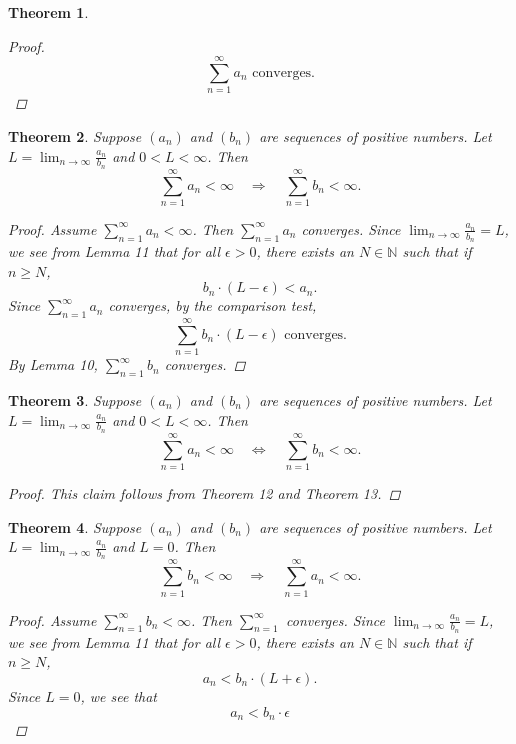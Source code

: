 \documentclass{amsart}
\newtheorem{theorem}{Theorem}
\begin{document}
\begin{enumerate}[1.]
\begin{theorem}
\begin{proof}
\[            \displaystyle \sum_{n=1}^{\infty} a_n \text{ converges.}
        \]
    \end{proof}
\end{theorem}
\begin{theorem}
    Suppose $(a_n)$ and $(b_n)$ are sequences of positive numbers. Let $\displaystyle L= \lim_{n\to\infty}\frac{a_n}{b_n}$ and $0 < L < \infty$.
    Then 
    \[ \sum_{n=1}^{\infty} a_n < \infty \quad \Rightarrow \quad \sum_{n=1}^{\infty} b_n < \infty.\]
    \begin{proof}
        Assume $\displaystyle \sum_{n = 1}^\infty a_n < \infty$. Then $\displaystyle \sum_{n = 1}^\infty a_n$ converges.
        Since $\displaystyle \lim_{n \to \infty} \frac{a_n}{b_n} = L$, we see from Lemma 11 that for all $\epsilon > 0$, there
        exists an $N\in\mathbb{N}$ such that if $n \geq N$,
        \[
            b_n \cdot (L - \epsilon) < a_n.
        \]
        Since $\displaystyle \sum_{n = 1}^\infty a_n$ converges, by the comparison test,
        \[
            \sum_{n = 1}^\infty b_n \cdot (L - \epsilon) \text{ converges.}
        \]
        By Lemma 10, $\displaystyle \sum_{n = 1}^\infty b_n$ converges.
    \end{proof}
\end{theorem}
\begin{theorem}
    Suppose $(a_n)$ and $(b_n)$ are sequences of positive numbers. Let $\displaystyle L= \lim_{n\to\infty}\frac{a_n}{b_n}$ and $0 < L < \infty$.
    Then 
    \[ \sum_{n=1}^{\infty} a_n < \infty \quad \Leftrightarrow \quad \sum_{n=1}^{\infty} b_n < \infty.\]
    \begin{proof}
        This claim follows from Theorem 12 and Theorem 13.
    \end{proof}
\end{theorem}
\begin{theorem}
    Suppose $(a_n)$ and $(b_n)$ are sequences of positive numbers. Let $\displaystyle L= \lim_{n\to\infty}\frac{a_n}{b_n}$ and $L = 0$.
    Then 
    \[ \sum_{n=1}^{\infty} b_n < \infty \quad \Rightarrow \quad \sum_{n=1}^{\infty} a_n < \infty.\]
    \begin{proof}
        Assume $\displaystyle \sum_{n = 1}^\infty b_n < \infty$. Then $\displaystyle \sum_{n = 1}^\infty$ converges.
        Since $\displaystyle \lim_{n \to \infty} \frac{a_n}{b_n} = L$, we see from Lemma 11 that for all $\epsilon > 0$, there
        exists an $N\in\mathbb{N}$ such that if $n \geq N$,
        \[
            a_n < b_n \cdot (L + \epsilon).
        \]
        Since $L = 0$, we see that
        \[
            a_n < b_n \cdot \epsilon    
        \]
        

\end{proof}
\end{theorem}
\end{enumerate}
\end{document}
